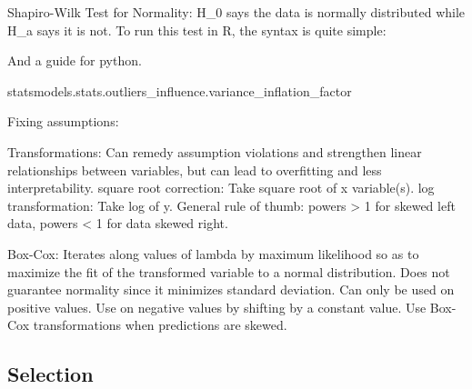 \documentclass[]{book}
\newenvironment{Shaded}{\begin{snugshade}}{\end{snugshade}}
\newcommand{\NormalTok}[1]{#1}
\theoremstyle{definition}
\theoremstyle{definition}
\theoremstyle{definition}
\theoremstyle{remark}
\begin{document}
Shapiro-Wilk Test for Normality: H\_0 says the data is normally
distributed while H\_a says it is not. To run this test in R, the syntax
is quite simple:

And a guide for python.

\begin{Shaded}
\begin{Highlighting}[]
\NormalTok{statsmodels.stats.outliers_influence.variance_inflation_factor}
\end{Highlighting}
\end{Shaded}

Fixing assumptions:

Transformations: Can remedy assumption violations and strengthen linear
relationships between variables, but can lead to overfitting and less
interpretability. square root correction: Take square root of x
variable(s). log transformation: Take log of y. General rule of thumb:
powers \textgreater{} 1 for skewed left data, powers \textless{} 1 for
data skewed right.

Box-Cox: Iterates along values of lambda by maximum likelihood so as to
maximize the fit of the transformed variable to a normal distribution.
Does not guarantee normality since it minimizes standard deviation. Can
only be used on positive values. Use on negative values by shifting by a
constant value. Use Box-Cox transformations when predictions are skewed.

\subsection{Selection}\label{selection}
\end{document}
